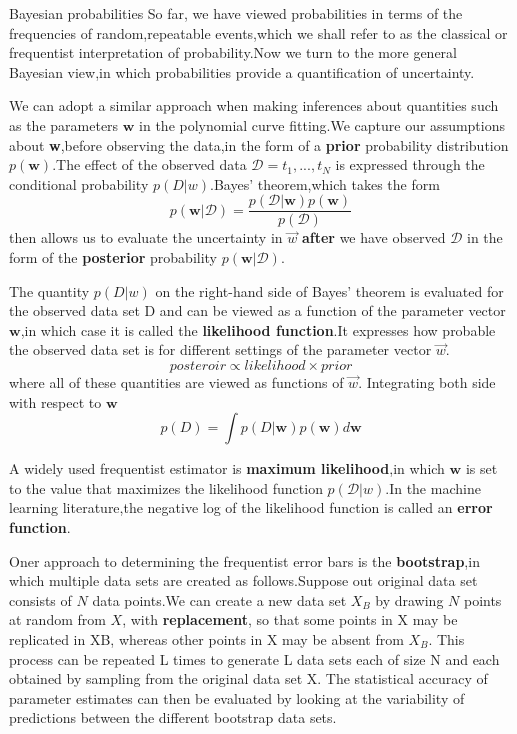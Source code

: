 Bayesian probabilities
So far, we have viewed probabilities in terms of the frequencies of random,repeatable events,which we shall refer to as the classical or frequentist interpretation of probability.Now we turn to the more general Bayesian view,in which probabilities provide a quantification of uncertainty.

We can adopt a similar approach when making inferences about quantities such as the parameters $\mathbf{w}$ in the polynomial curve fitting.We capture our assumptions about \textbf{w},before observing the data,in the form of a \textbf{prior} probability distribution $p(\mathbf{w})$.The effect of the observed data $\mathcal{D} = {t_1,...,t_N}$ is expressed through the conditional probability $p(D|w)$.Bayes' theorem,which takes the form
\begin{equation}
p(\textbf{w}|\mathcal{D}) = \frac{p(\mathcal{D}|\textbf{w})p(\textbf{w})}{p(\mathcal{D})}
\end{equation}
then allows us to evaluate the uncertainty in $\vec{w}$ \textbf{after} we have observed $\mathcal{D}$ in the form of the \textbf{posterior} probability $p(\mathbf{w}|\mathcal{D})$.

The quantity $p(D|w)$ on the right-hand side of Bayes' theorem is evaluated for the observed data set D and 
can be viewed as a function of the parameter vector $\mathbf{w}$,in which case it is called the \textbf{likelihood function}.It expresses how probable the observed data set is for different settings of the parameter vector $\vec{w}$.
\begin{equation}
posteroir \propto likelihood \times prior
\end{equation}
where all of these quantities are viewed as functions of $\vec{w}$.
 Integrating both side with respect to $\mathbf{w}$
 \begin{equation}
p(D) = \int p(D|\mathbf{w}) p(\mathbf{w})d\mathbf{w} 
 \end{equation}

A widely used frequentist estimator is \textbf{maximum likelihood},in which $\mathbf{w}$ is set to the value that maximizes the likelihood function $p(\mathcal{D}|w)$.In the machine learning literature,the negative log of the likelihood function is called an \textbf{error function}.

Oner approach to determining the frequentist error bars is the \textbf{bootstrap},in which multiple data sets are created as follows.Suppose out original data set consists of $N$ data points.We can create a new data set $X_B$ by drawing $N$ points at random from $X$, with \textbf{replacement}, so that some points in X may be replicated in XB, whereas other points in X may be absent from $X_B$. This process can be repeated L times to generate L data sets each of size N and each obtained by sampling from the original data set X. The statistical accuracy of parameter estimates can then be evaluated by looking at the variability of predictions between the different bootstrap data sets.



